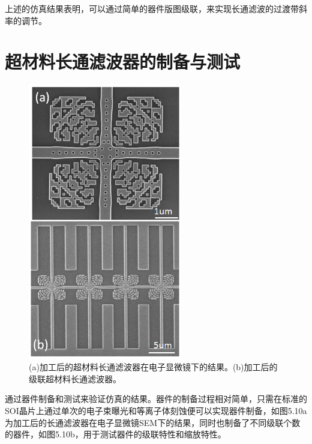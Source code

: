 上述的仿真结果表明，可以通过简单的器件版图级联，来实现长通滤波的过渡带斜率的调节。

\section{超材料长通滤波器的制备与测试}

\begin{figure}[!htbp]
    \centering
    \includegraphics[width=0.6\textwidth]{Img/5-10.png}
    \caption{ (a)加工后的超材料长通滤波器在电子显微镜下的结果。(b)加工后的级联超材料长通滤波器。}
    \label{fig:5-10}
\end{figure}

通过器件制备和测试来验证仿真的结果。器件的制备过程相对简单，只需在标准的SOI晶片上通过单次的电子束曝光和等离子体刻蚀便可以实现器件制备，如图5.10a为加工后的长通滤波器在电子显微镜SEM下的结果，同时也制备了不同级联个数的器件，如图5.10b，用于测试器件的级联特性和缩放特性。

